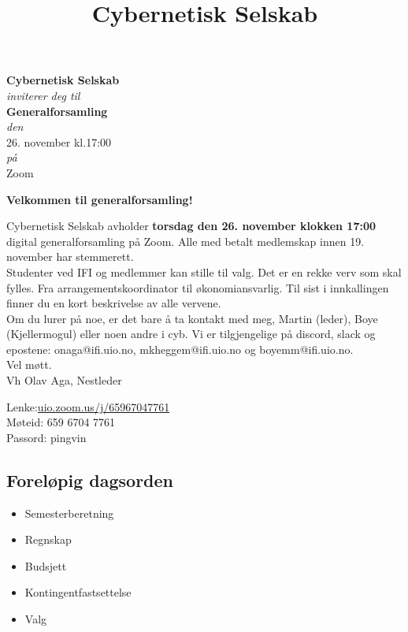\documentclass[12pt, norsk, a4paper]{proc}
\title{Cybernetisk Selskab}
\providecommand{\tightlist}{%
  \setlength{\itemsep}{0pt}\setlength{\parskip}{0pt}}
\begin{document}
    \begin{strip}
   \begin{center}
    \Large\textbf{Cybernetisk Selskab}\\
    \textit{inviterer deg til}\\
    \large\textbf{Generalforsamling} \\
    \emph{den} \\
    \large 26. november kl.17:00 \\
    \emph{på} \\
    Zoom
   \end{center}
   \end{strip}

\textbf{Velkommen til generalforsamling!}

Cybernetisk Selskab avholder \textbf{torsdag den 26. november klokken 17:00} digital generalforsamling på Zoom. Alle med betalt medlemskap innen 19.
november har stemmerett.\\

Studenter ved IFI og medlemmer kan stille til valg. Det er en rekke verv
som skal fylles. Fra arrangementskoordinator til økonomiansvarlig. Til
sist i innkallingen finner du en kort beskrivelse av alle vervene.\\

Om du lurer på noe, er det bare å ta kontakt med meg, Martin (leder),
Boye (Kjellermogul) eller noen andre i cyb. Vi er tilgjengelige på
discord, slack og epostene: onaga@ifi.uio.no, mkheggem@ifi.uio.no og
boyemm@ifi.uio.no.\\

Vel møtt.\\

Vh Olav Aga, Nestleder

Lenke:\href{https://uio.zoom.us/j/65967047761?pwd=aXVwajE4V1ZhcG5uRW9SN2VTNnM0Zz09}{uio.zoom.us/j/65967047761}\\
Møteid: 659 6704 7761\\
Passord: pingvin

\hypertarget{foreluxf8pig-dagsorden}{%
\subsection*{Foreløpig dagsorden}\label{foreluxf8pig-dagsorden}}

\begin{itemize}
\tightlist
\item
  Semesterberetning
\item
  Regnskap
\item
  Budsjett
\item
  Kontingentfastsettelse
\item
  Valg
\end{itemize}
\end{document}
